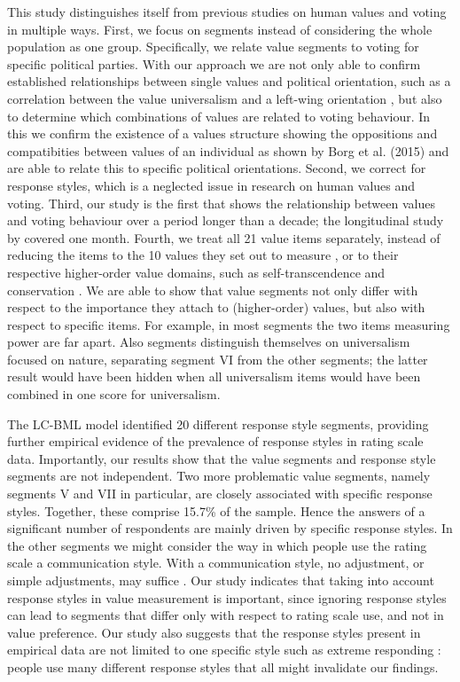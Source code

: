 \documentclass[12pt,letter]{article}\usepackage[]{graphicx}\usepackage[]{xcolor}
\begin{document}
This study distinguishes itself from previous studies on human values and voting in multiple ways. First, we focus on segments instead of considering the whole population as one group. Specifically, we relate value segments to voting for specific political parties. With our approach we are not only able to confirm established relationships between single values and political orientation, such as a correlation between the value universalism and a left-wing orientation \citep[e.g,][]{caprara2006}, but also to determine which combinations of values are related to voting behaviour. In this we confirm the existence of a values structure showing the oppositions and compatibities between values of an individual as shown by Borg et al. (2015) and are able to relate this to specific political orientations. Second, we correct for response styles, which is a neglected issue in research on human values and voting. Third, our study is the first that shows the relationship between values and voting behaviour over a period longer than a decade; the longitudinal study by \citet{schwartz2010} covered one month. Fourth, we treat all 21 value items separately, instead of reducing the items to the 10 values they set out to measure \citep{piurko2011,caprara2006}, or to their respective higher-order value domains, such as self-transcendence and conservation \citep{barnea1998}. We are able to show that value segments not only differ with respect to the importance they attach to (higher-order) values, but also with respect to specific items. For example, in most segments the two items measuring power are far apart. Also segments distinguish themselves on universalism focused on nature, separating segment VI from the other segments; the latter result would have been hidden when all universalism items would have been combined in one score for universalism.  

The LC-BML model identified 20 different response style segments, providing further empirical evidence of the prevalence of response styles in rating scale data. Importantly, our results show that the value segments and response style segments are not independent. Two more problematic value segments, namely segments V and VII in particular, are closely associated with specific response styles. Together, these comprise 15.7\% of the sample. Hence the answers of a significant number of respondents are mainly driven by specific response styles. In the other segments we might consider the way in which people use the rating scale a communication style. With a communication style, no adjustment, or simple adjustments, may suffice \citep{he2015}. Our study indicates that taking into account response styles in value measurement is important, since ignoring response styles can lead to segments that differ only with respect to rating scale use, and not in value preference. Our study also suggests that the response styles present in empirical data are not limited to one specific style such as extreme responding \citep[for example,][]{liu2015,jong2008}: people use many different response styles that all might invalidate our findings.
\end{document}
